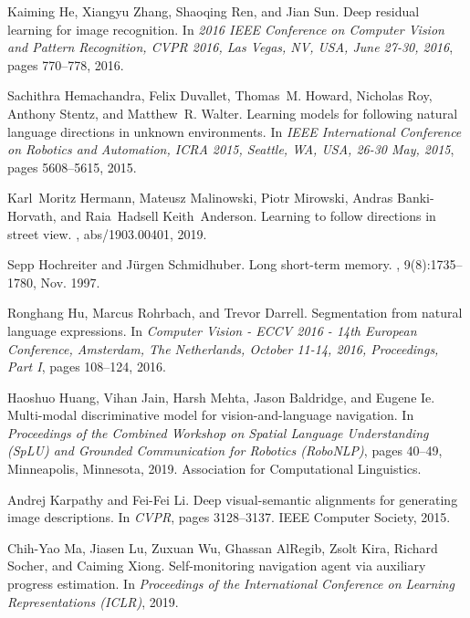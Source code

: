 \documentclass[10pt,twocolumn,letterpaper]{article}
\begin{document}
\begin{thebibliography}{10}
Kaiming He, Xiangyu Zhang, Shaoqing Ren, and Jian Sun.
\newblock Deep residual learning for image recognition.
\newblock In {\em 2016 {IEEE} Conference on Computer Vision and Pattern
  Recognition, {CVPR} 2016, Las Vegas, NV, USA, June 27-30, 2016}, pages
  770--778, 2016.

Sachithra Hemachandra, Felix Duvallet, Thomas~M. Howard, Nicholas Roy, Anthony
  Stentz, and Matthew~R. Walter.
\newblock Learning models for following natural language directions in unknown
  environments.
\newblock In {\em {IEEE} International Conference on Robotics and Automation,
  {ICRA} 2015, Seattle, WA, USA, 26-30 May, 2015}, pages 5608--5615, 2015.

Karl~Moritz Hermann, Mateusz Malinowski, Piotr Mirowski, Andras Banki-Horvath,
  and Raia~Hadsell Keith~Anderson.
\newblock Learning to follow directions in street view.
, abs/1903.00401, 2019.

Sepp Hochreiter and J\"{u}rgen Schmidhuber.
\newblock Long short-term memory.
, 9(8):1735--1780, Nov. 1997.

Ronghang Hu, Marcus Rohrbach, and Trevor Darrell.
\newblock Segmentation from natural language expressions.
\newblock In {\em Computer Vision - {ECCV} 2016 - 14th European Conference,
  Amsterdam, The Netherlands, October 11-14, 2016, Proceedings, Part {I}},
  pages 108--124, 2016.

Haoshuo Huang, Vihan Jain, Harsh Mehta, Jason Baldridge, and Eugene Ie.
\newblock Multi-modal discriminative model for vision-and-language navigation.
\newblock In {\em Proceedings of the Combined Workshop on Spatial Language
  Understanding ({S}p{LU}) and Grounded Communication for Robotics
  ({R}obo{NLP})}, pages 40--49, Minneapolis, Minnesota, 2019. Association for
  Computational Linguistics.

Andrej Karpathy and Fei{-}Fei Li.
\newblock Deep visual-semantic alignments for generating image descriptions.
\newblock In {\em {CVPR}}, pages 3128--3137. {IEEE} Computer Society, 2015.

Chih-Yao Ma, Jiasen Lu, Zuxuan Wu, Ghassan AlRegib, Zsolt Kira, Richard Socher,
  and Caiming Xiong.
\newblock Self-monitoring navigation agent via auxiliary progress estimation.
\newblock In {\em Proceedings of the International Conference on Learning
  Representations (ICLR)}, 2019.


\end{thebibliography}
\end{document}

